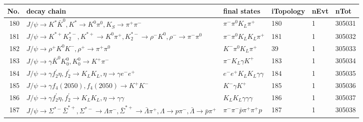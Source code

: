 \begin{table}[htbp] 
\begin{center}
\begin{small}
\begin{tabular}{rlllll}\hline\hline
 No. & decay chain & final states &  iTopology & nEvt & nTot \\\hline
180&$J/\psi       \rightarrow K^{*}          \bar{K}^{0}   , K^{*}           \rightarrow K^{0}          \pi^{0}        , K_{S}           \rightarrow \pi^{+}        \pi^{-}        $&$\pi^{-}        \pi^{0}        K_{L}          \pi^{+}        $&  180&    1&305031\\
181&$J/\psi       \rightarrow K^{*+}         K_2^{*-}       , K^{*+}          \rightarrow K^{0}          \pi^{+}        , K_2^{*-}        \rightarrow \rho^{-}      K^{0}          , \rho^{-}       \rightarrow \pi^{-}        \pi^{0}        $&$\pi^{-}        \pi^{0}        K_{L}          K_{L}          \pi^{+}        $&  181&    1&305032\\
182&$J/\psi       \rightarrow \rho^{+}      K^{0}          K^{-}          , \rho^{+}       \rightarrow \pi^{+}        \pi^{0}        $&$K^{-}          \pi^{0}        K_{L}          \pi^{+}        $&   39&    1&305033\\
183&$J/\psi       \rightarrow \gamma       \bar{K}^{0}   K_0^{0}        , K_0^{0}         \rightarrow K^{+}          \pi^{-}        $&$\pi^{-}        K_{L}          \gamma       K^{+}          $&  183&    1&305034\\
184&$J/\psi       \rightarrow \gamma       f_2^{'}       \eta          , f_2^{'}        \rightarrow K_{L}          K_{L}          , \eta           \rightarrow \gamma       e^{-}        e^{+}        $&$e^{-}        e^{+}        K_{L}          K_{L}          \gamma       \gamma       $&  184&    1&305035\\
185&$J/\psi       \rightarrow \gamma       f_{4}(2050)    , f_{4}(2050)     \rightarrow K^{+}          K^{-}          $&$K^{-}          \gamma       K^{+}          $&  185&    1&305036\\
186&$J/\psi       \rightarrow \gamma       f_2^{'}       \eta          , f_2^{'}        \rightarrow K_{L}          K_{L}          , \eta           \rightarrow \gamma       \gamma       $&$K_{L}          K_{L}          \gamma       \gamma       \gamma       $&  186&    1&305037\\
187&$J/\psi       \rightarrow \Sigma^{*-}       \bar{\Sigma}^{*+}, \Sigma^{*-}        \rightarrow \Lambda           \pi^{-}        , \bar{\Sigma}^{*+} \rightarrow \bar{\Lambda}    \pi^{+}        , \Lambda            \rightarrow p                 \pi^{-}        , \bar{\Lambda}     \rightarrow \bar{p}          \pi^{+}        $&$\pi^{-}        \pi^{-}        \bar{p}          \pi^{+}        \pi^{+}        p                 $&  187&    1&305038\\

\end{tabular}
\end{small}
\end{center}
\end{table}
